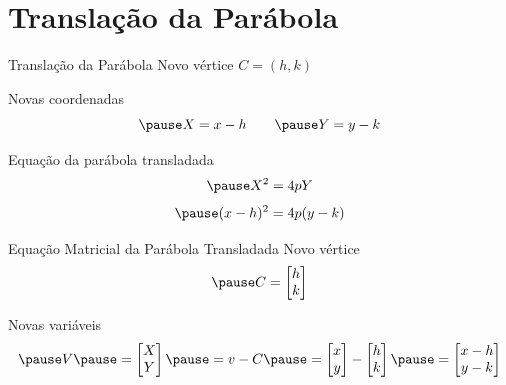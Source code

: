 \documentclass[fleqn,aspectratio=169,12pt]{beamer}
\begin{document}


\section{Translação da Parábola}

\begin{frame}{Translação da Parábola}
  Novo vértice \(C = (h, k)\)

  \pause
  Novas coordenadas
  \[
    \pause
    X = x - h
    \qquad
    \pause
    Y = y - k
  \]

  \pause
  Equação da parábola transladada
  \[
    \pause
    X^2 = 4pY
  \]
  \[
    \pause
    (x-h)^2 = 4p(y-k)
  \]
\end{frame}

\begin{proofframe}{Equação Matricial da Parábola Transladada}
  Novo vértice
  \[
    \pause
    C
    = \begin{bmatrix}
      h \\
      k
    \end{bmatrix}
  \]

  \bigskip
  \pause
  Novas variáveis
  \[
    \pause
    V
    \pause
    = \begin{bmatrix}
      X \\
      Y
    \end{bmatrix}
    \pause
    = v - C
    \pause
    = \begin{bmatrix}
      x \\
      y
    \end{bmatrix}
    -
    \begin{bmatrix}
      h \\
      k
    \end{bmatrix}
    \pause
    = \begin{bmatrix}
      x - h \\
      y - k
    \end{bmatrix}
  \]
\end{proofframe}
\end{document}
